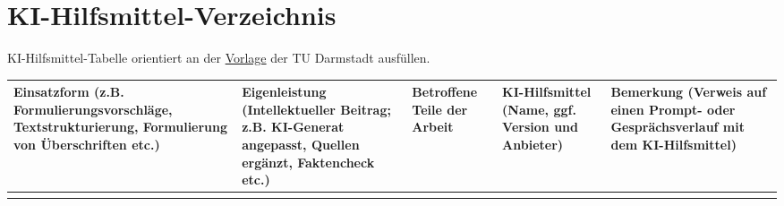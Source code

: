 \documentclass[
	thesis={type=msc}, %
	class=report,%
	ruledheaders=section,%
	accentcolor=1b, %
	marginpar=false,%
	parskip=half-,%
	fontsize=11pt,%
	IMRAD=false, %
]{tudapub}
\begin{document}








\cleardoublepage
\ifdocenglish
    \printbibliography[title={Bibliography}]
\else
    \printbibliography[title={Literaturverzeichnis}]
\fi
\cleardoublepage

\chapter*{KI-Hilfsmittel-Verzeichnis}

KI-Hilfsmittel-Tabelle orientiert an der \href{https://www.ulb.tu-darmstadt.de/media/ulb/forschen_publizieren/ki/ki_empfehlung_kurz.de.pdf}{Vorlage} der TU Darmstadt ausfüllen.

\begin{longtable}{|p{}|p{}|p{}|p{}|p{}|}
\hline
\rowcolor[HTML]{C0C0C0} 
{\color[HTML]{DEDEDE} } \textbf{Einsatzform} \; (z.B. Formulierungsvorschläge, Textstrukturierung, Formulierung von Überschriften etc.) & {\color[HTML]{DEDEDE} } \textbf{Eigenleistung} (Intellektueller Beitrag; z.B. KI-Generat angepasst, Quellen ergänzt, Faktencheck etc.) & {\color[HTML]{DEDEDE} } \textbf{Betroffene
Teile der Arbeit} & {\color[HTML]{DEDEDE}}\textbf{KI-Hilfsmittel} \; (Name, ggf. Version und Anbieter) & {\color[HTML]{DEDEDE}} \textbf{Bemerkung} \;\; (Verweis auf einen Prompt- oder Gesprächsverlauf mit dem KI-Hilfsmittel)
 \\ \hline
\endfirsthead
\endhead
 &   &  &   &  \\ \hline


\end{longtable}   

\appendix
	
	
	
	

\end{document}

